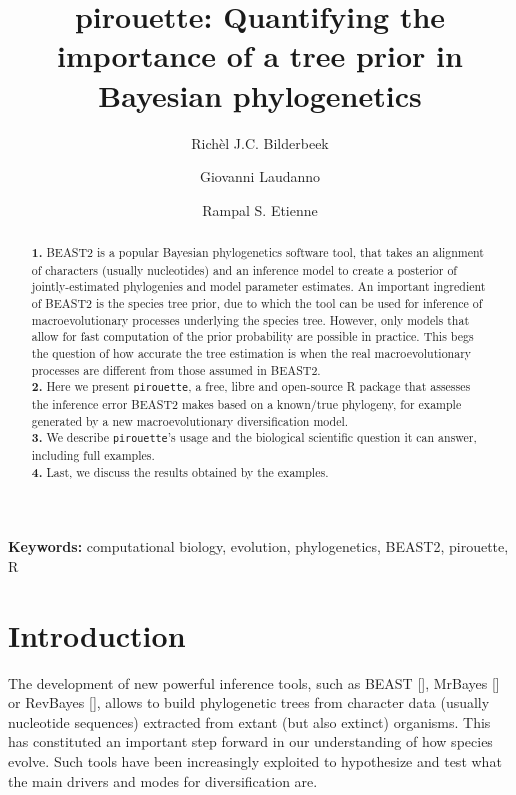 \documentclass{article}
\title{pirouette: Quantifying the importance of a tree prior in Bayesian phylogenetics}
\author[1]{Rich\`el J.C. Bilderbeek}
\author[1]{Giovanni Laudanno}
\author[1]{Rampal S. Etienne}
\affil[1]{Groningen Institute for Evolutionary Life Sciences, University of Groningen, Groningen, The Netherlands}
\begin{document}
\maketitle

\begin{abstract}

  \textbf{1. }
    BEAST2 is a popular Bayesian phylogenetics software tool,
    that takes an alignment of characters (usually nucleotides) 
    and an inference model to create a
    posterior of jointly-estimated phylogenies and model parameter 
    estimates. An important ingredient of BEAST2 is 
    the species tree prior, 
    due to which the tool can be used for inference of 
    macroevolutionary processes underlying the species tree. 
    However, only models that allow for fast computation of 
    the prior probability are possible in practice. 
    This begs the question of how accurate the tree estimation is 
    when the real macroevolutionary processes are different 
    from those assumed in BEAST2. \\
  \textbf{2. }
    Here we present \verb;pirouette;, 
    a free, libre and open-source R package that assesses 
    the inference error BEAST2 makes based on a known/true 
    phylogeny, for example generated by a new 
    macroevolutionary diversification model. \\
  \textbf{3. }
    We describe \verb;pirouette;'s usage and the biological scientific
    question it can answer, including full examples. \\
  \textbf{4. }
    Last, we discuss the results obtained by the examples. \\
\end{abstract}

{\bf Keywords:} computational biology, evolution, phylogenetics, BEAST2, pirouette, R

\section{Introduction}

The development of new powerful inference tools, 
such as BEAST [\cite{drummond2007beast}], 
MrBayes [\cite{huelsenbeck2001mrbayes}]
or RevBayes [\cite{hohna2016revbayes}], 
allows to build phylogenetic trees 
from character data (usually nucleotide sequences) extracted 
from extant (but also extinct) organisms.
This has constituted an important step forward 
in our understanding of how species evolve.
Such tools have been increasingly exploited to hypothesize 
and test what the main drivers and modes for diversification are.
\end{document}

